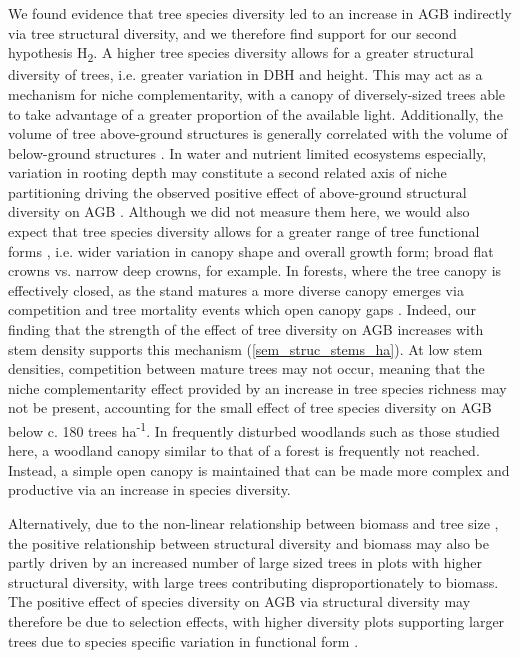 \documentclass[12pt,a4paper]{article}
\begin{document}
We found evidence that tree species diversity led to an increase in AGB indirectly via tree structural diversity, and we therefore find support for our second hypothesis H\textsubscript{2}. A higher tree species diversity allows for a greater structural diversity of trees, i.e. greater variation in DBH and height. This may act as a mechanism for niche complementarity, with a canopy of diversely-sized trees able to take advantage of a greater proportion of the available light. Additionally, the volume of tree above-ground structures is generally correlated with the volume of below-ground structures \citep{Paul2019}. In water and nutrient limited ecosystems especially, variation in rooting depth may constitute a second related axis of niche partitioning driving the observed positive effect of above-ground structural diversity on AGB \citep{Kulmatiski2013}. Although we did not measure them here, we would also expect that tree species diversity allows for a greater range of tree functional forms \citep{Pretzsch2014}, i.e. wider variation in canopy shape and overall growth form; broad flat crowns vs. narrow deep crowns, for example. In forests, where the tree canopy is effectively closed, as the stand matures a more diverse canopy emerges via competition and tree mortality events which open canopy gaps \citep{Muscolo2014}. Indeed, our finding that the strength of the effect of tree diversity on AGB increases with stem density supports this mechanism (\autoref{sem_struc_stems_ha}). At low stem densities, competition between mature trees may not occur, meaning that the niche complementarity effect provided by an increase in tree species richness may not be present, accounting for the small effect of tree species diversity on AGB below c. 180 trees ha\textsuperscript{-1}. In frequently disturbed woodlands such as those studied here, a woodland canopy similar to that of a forest is frequently not reached. Instead, a simple open canopy is maintained that can be made more complex and productive via an increase in species diversity.

Alternatively, due to the non-linear relationship between biomass and tree size \citep{Bastin2018}, the positive relationship between structural diversity and biomass may also be partly driven by an increased number of large sized trees in plots with higher structural diversity, with large trees contributing disproportionately to biomass. The positive effect of species diversity on AGB via structural diversity may therefore be due to selection effects, with higher diversity plots supporting larger trees due to species specific variation in functional form \citep{Diaz2015}.
\end{document}
